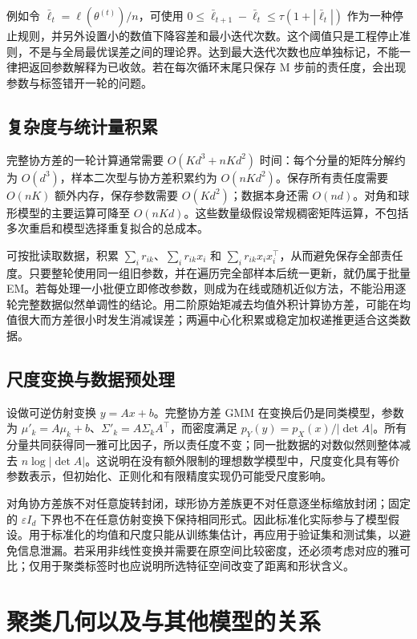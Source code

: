 \documentclass[UTF8]{ctexart}
\begin{document}
例如令 $\bar\ell_t=\ell(\theta^{(t)})/n$，可使用 $0\leq\bar\ell_{t+1}-\bar\ell_t\leq\tau(1+|\bar\ell_t|)$ 作为一种停止规则，并另外设置小的数值下降容差和最小迭代次数。这个阈值只是工程停止准则，不是与全局最优误差之间的理论界。达到最大迭代次数也应单独标记，不能一律把返回参数解释为已收敛。若在每次循环末尾只保存 M 步前的责任度，会出现参数与标签错开一轮的问题。

\subsection{复杂度与统计量积累}
完整协方差的一轮计算通常需要 $O(Kd^3+nKd^2)$ 时间：每个分量的矩阵分解约为 $O(d^3)$，样本二次型与协方差积累约为 $O(nKd^2)$。保存所有责任度需要 $O(nK)$ 额外内存，保存参数需要 $O(Kd^2)$；数据本身还需 $O(nd)$。对角和球形模型的主要运算可降至 $O(nKd)$。这些数量级假设常规稠密矩阵运算，不包括多次重启和模型选择重复拟合的总成本。

可按批读取数据，积累 $\sum_i r_{ik}$、$\sum_i r_{ik}x_i$ 和 $\sum_i r_{ik}x_ix_i^\top$，从而避免保存全部责任度。只要整轮使用同一组旧参数，并在遍历完全部样本后统一更新，就仍属于批量 EM。若每处理一小批便立即修改参数，则成为在线或随机近似方法，不能沿用逐轮完整数据似然单调性的结论。用二阶原始矩减去均值外积计算协方差，可能在均值很大而方差很小时发生消减误差；两遍中心化积累或稳定加权递推更适合这类数据。

\subsection{尺度变换与数据预处理}
设做可逆仿射变换 $y=Ax+b$。完整协方差 GMM 在变换后仍是同类模型，参数为 $\mu'_k=A\mu_k+b$、$\Sigma'_k=A\Sigma_kA^\top$，而密度满足 $p_Y(y)=p_X(x)/|\det A|$。所有分量共同获得同一雅可比因子，所以责任度不变；同一批数据的对数似然则整体减去 $n\log|\det A|$。这说明在没有额外限制的理想数学模型中，尺度变化具有等价参数表示，但初始化、正则化和有限精度实现仍可能受尺度影响。

对角协方差族不对任意旋转封闭，球形协方差族更不对任意逐坐标缩放封闭；固定的 $\varepsilon I_d$ 下界也不在任意仿射变换下保持相同形式。因此标准化实际参与了模型假设。用于标准化的均值和尺度只能从训练集估计，再应用于验证集和测试集，以避免信息泄漏。若采用非线性变换并需要在原空间比较密度，还必须考虑对应的雅可比；仅用于聚类标签时也应说明所选特征空间改变了距离和形状含义。

\section{聚类几何以及与其他模型的关系}
\label{sec:gmm-relations}
\end{document}
